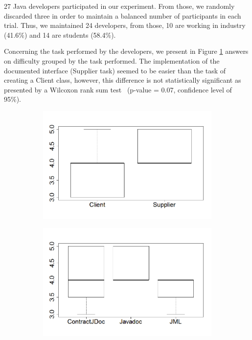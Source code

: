 27 Java developers participated in our experiment. From those, we 
randomly discarded three in order to maintain a balanced
number of participants in each trial. Thus, we maintained 24 developers, from those, 
10 are working in industry (41.6\%) and 14 are students (58.4\%).


Concerning the task performed by the developers, we present in
Figure \ref{fig:tasksEmpirical}
answers on difficulty grouped by the task performed.
The implementation of the documented interface (Supplier task) seemed to be easier
than the task of creating a Client class, however, this difference is not
statistically significant as presented by a Wilcoxon rank sum test~\cite{statistical}
(p-value = 0.07, confidence level of 95\%).
%

\begin{figure}
\centering
\begin{subfigure}{.3\textwidth}
\includegraphics[width=1\linewidth]{figs/boxplotTasksEmpiricalStudy}
\caption{}
\label{fig:tasksEmpirical}
\end{subfigure}
\begin{subfigure}{.3\textwidth}
\includegraphics[width=1\linewidth]{figs/boxplotApproachesEmpiricalStudy}

\end{subfigure}
\end{figure}
